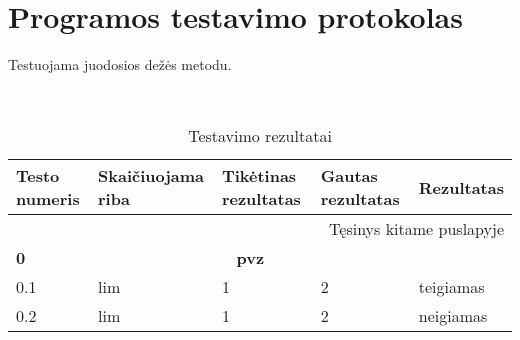 \section{Programos testavimo protokolas}

Testuojama juodosios dežės metodu.


\begin{center}
    \newcommand*\rot{\rotatebox{90}}
    \newcommand{\x}{$\times$}
    \newcommand{\green}{\cellcolor{green!50} teigiamas}
    \newcommand{\red}{\cellcolor{red!50} neigiamas}
    \newcommand{\noLimit}{Riba neegzistuoja}
    \newcommand{\header}[2]{\textbf{#1} & \multicolumn{3}{c}{\textbf{#2}} & \\ \hline}
\
    \begin{longtable}{|m{}|m{}|m{}|m{}|m{}|}
    \caption{Testavimo rezultatai} \label{tab:rez} \\
    \hline
        \textbf{Testo numeris} & \textbf{Skaičiuojama riba} &\textbf{Tikėtinas rezultatas} & \textbf{Gautas rezultatas} & \textbf{Rezultatas} \\ \hline
    \endhead
        \multicolumn{5}{|r|}{{Tęsinys kitame puslapyje}} \\ \hline
    \endfoot
    \hline \hline
    \endlastfoot
    \header{0}{pvz}
    0.1 & lim & 1 & 2  & \green \\ \hline
    0.2 & lim & 1 & 2  & \red \\ \hline


\end{longtable}
\end{center}
